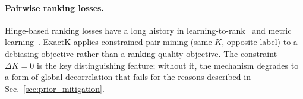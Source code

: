 \paragraph{Pairwise ranking losses.} Hinge-based ranking losses have a long history in learning-to-rank~\cite{PLACEHOLDER_ranknet} and metric learning~\cite{PLACEHOLDER_contrastive}. ExactK applies constrained pair mining (same-$K$, opposite-label) to a debiasing objective rather than a ranking-quality objective. The constraint $\Delta K{=}0$ is the key distinguishing feature; without it, the mechanism degrades to a form of global decorrelation that fails for the reasons described in Sec.~\ref{sec:prior_mitigation}.
